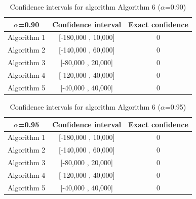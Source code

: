 \documentclass[a4paper,10pt]{article}
\begin{document}
\begin{table}[!htp]
\centering\small
\begin{tabular}{
|c|c|c|}
\hline
 $\alpha$=0.90 & Confidence interval & Exact confidence \\ \hline 
Algorithm 1 & [-180,000 , 10,000] & 0\\ \hline 
Algorithm 2 & [-140,000 , 60,000] & 0\\ \hline 
Algorithm 3 & [-80,000 , 20,000] & 0\\ \hline 
Algorithm 4 & [-120,000 , 40,000] & 0\\ \hline 
Algorithm 5 & [-40,000 , 40,000] & 0\\ \hline 

\end{tabular}
\caption{Confidence intervals for algorithm Algorithm 6 ($\alpha$=0.90)}
\end{table}
\begin{table}[!htp]
\centering\small
\begin{tabular}{
|c|c|c|}
\hline
 $\alpha$=0.95 & Confidence interval & Exact confidence \\ \hline 
Algorithm 1 & [-180,000 , 10,000] & 0\\ \hline 
Algorithm 2 & [-140,000 , 60,000] & 0\\ \hline 
Algorithm 3 & [-80,000 , 20,000] & 0\\ \hline 
Algorithm 4 & [-120,000 , 40,000] & 0\\ \hline 
Algorithm 5 & [-40,000 , 40,000] & 0\\ \hline 

\end{tabular}
\caption{Confidence intervals for algorithm Algorithm 6 ($\alpha$=0.95)}
\end{table}

 \clearpage 
\end{document}
